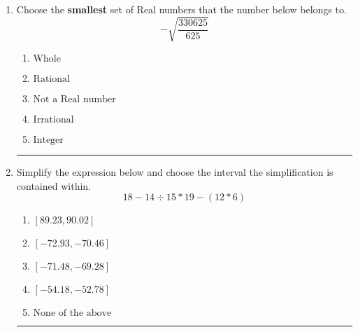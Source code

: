 \documentclass[14pt]{extbook}
\newcommand{\litem}[1]{\item#1\hspace*{-1cm}\rule{\textwidth}{0.4pt}}
\begin{document}
\begin{enumerate}
{\begin{enumerate}[label=\Alph*.]
\end{enumerate} }
\litem{
Choose the \textbf{smallest} set of Real numbers that the number below belongs to.\[ -\sqrt{\frac{330625}{625}} \]\begin{enumerate}[label=\Alph*.]
\item \( \text{Whole} \)
\item \( \text{Rational} \)
\item \( \text{Not a Real number} \)
\item \( \text{Irrational} \)
\item \( \text{Integer} \)

\end{enumerate} }
\litem{
Simplify the expression below and choose the interval the simplification is contained within.\[ 18 - 14 \div 15 * 19 - (12 * 6) \]\begin{enumerate}[label=\Alph*.]
\item \( [89.23, 90.02] \)
\item \( [-72.93, -70.46] \)
\item \( [-71.48, -69.28] \)
\item \( [-54.18, -52.78] \)
\item \( \text{None of the above} \)

\end{enumerate} }
\end{enumerate}
\end{document}
